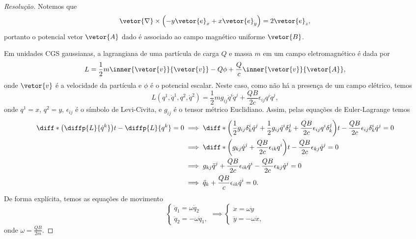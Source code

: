 \begin{proof}[Resolução]
    Notemos que
    \begin{equation*}
        \vetor{\nabla} \times \left(- y\vetor{e}_x + x\vetor{e}_y\right) = 2 \vetor{e}_z,
    \end{equation*}
    portanto o potencial vetor \(\vetor{A}\) dado é associado ao campo magnético uniforme \(\vetor{B}\).

    Em unidades CGS gaussianas, a lagrangiana de uma partícula de carga \(Q\) e massa \(m\) em um campo eletromagnético é dada por
    \begin{equation*}
    L = \frac12 m\inner{\vetor{v}}{\vetor{v}} - Q\phi + \frac{Q}{c} \inner{\vetor{v}}{\vetor{A}},
    \end{equation*}
    onde \(\vetor{v}\) é a velocidade da partícula e \(\phi\) é o potencial escalar. Neste caso, como não há a presença de um campo elétrico, temos
    \begin{equation*}
        L(q^1,\dot{q}^1, q^2, \dot{q}^2) = \frac12 m g_{ij}\dot{q}^i \dot{q}^j + \frac{QB}{2c} \epsilon_{ij}q^i\dot{q}^j,
    \end{equation*}
    onde \(q^1 = x\), \(q^2 = y\), \(\epsilon_{ij}\) é o símbolo de Levi-Civita, e \(g_{ij}\) é o tensor métrico Euclidiano. Assim, pelas equações de Euler-Lagrange temos
    \begin{align*}
        \diff*{\left(\diffp{L}{\dot{q}^k}\right)}{t} - \diffp{L}{q^k} = 0 &\implies \diff*{\left(\frac12 g_{ij} \delta^i_k \dot{q}^j + \frac12 g_{ij} \dot{q}^i\delta^j_k + \frac{QB}{2c}\epsilon_{ij} q^i \delta^j_k\right)}{t} - \frac{QB}{2c} \epsilon_{ij}\delta^i_k \dot{q}^j = 0\\
                                                                          &\implies \diff*{\left(g_{kj} \dot{q}^j + \frac{QB}{2c}\epsilon_{ik} q^i \right)}{t} - \frac{QB}{2c} \epsilon_{kj}\dot{q}^j = 0\\
                                                                          &\implies g_{kj} \ddot{q}^j + \frac{QB}{2c}\epsilon_{ik} \dot{q}^i - \frac{QB}{2c} \epsilon_{kj}\dot{q}^j = 0\\
                                                                          &\implies \ddot{q}_k + \frac{QB}{c}\epsilon_{ik} \dot{q}^i = 0.
    \end{align*}
    De forma explícita, temos as equações de movimento
    \begin{equation*}
        \begin{cases}
            \ddot{q}_1 = \omega\dot{q}_2\\
            \ddot{q}_2 = -\omega\dot{q}_1,
        \end{cases} \implies
        \begin{cases}
            \ddot{x} = \omega\dot{y}\\
            \ddot{y} = -\omega\dot{x},
        \end{cases}
    \end{equation*}
    onde \(\omega = \frac{QB}{2m}\).


\end{proof}
